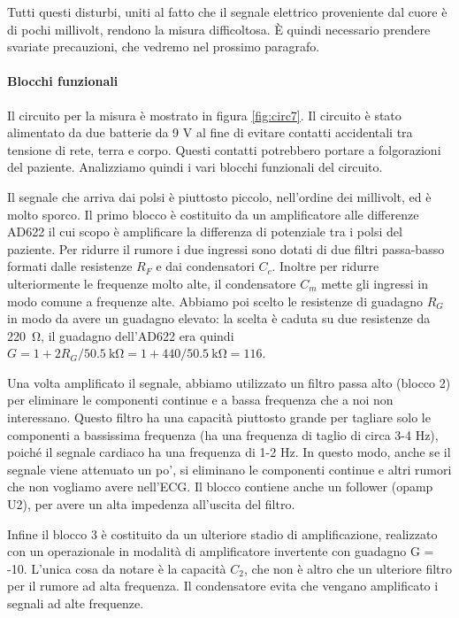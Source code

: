 Tutti questi disturbi, uniti al fatto che il segnale elettrico proveniente dal cuore è di pochi
millivolt, rendono la misura difficoltosa. È quindi necessario prendere svariate precauzioni, che vedremo nel
prossimo paragrafo.

\paragraph{Blocchi funzionali}

Il circuito per la misura è mostrato in figura \ref{fig:circ7}. Il circuito è stato alimentato da due batterie da
9 V al fine di evitare contatti accidentali tra tensione di rete, terra e corpo. Questi contatti potrebbero portare
a folgorazioni del paziente. Analizziamo quindi i vari blocchi funzionali del circuito.

Il segnale che arriva dai polsi è piuttosto piccolo, nell'ordine dei millivolt, ed è molto sporco.
Il primo blocco è costituito da un amplificatore alle differenze AD622 il cui scopo è amplificare
la differenza di potenziale tra i polsi del paziente. Per ridurre il rumore i due ingressi sono dotati
di due filtri passa-basso formati dalle resistenze $R_F$ e dai condensatori $C_c$. Inoltre per ridurre
ulteriormente le frequenze molto alte, il condensatore $C_m$ mette gli ingressi in modo comune
a frequenze alte. Abbiamo poi scelto le resistenze di guadagno $R_G$ in modo da avere un guadagno elevato:
la scelta è caduta su due resistenze da \SI{220}{\ohm}, il guadagno dell'AD622 era quindi
$G = 1 + 2R_G/\SI{50.5}{\kilo\ohm} = 1 + 440/\SI{50.5}{\kilo\ohm} = 116$. 

Una volta amplificato il segnale, abbiamo utilizzato un filtro passa alto (blocco 2)
per eliminare le componenti continue e a bassa frequenza che a noi non interessano.
Questo filtro ha una capacità piuttosto grande per tagliare solo le componenti a bassissima frequenza
(ha una frequenza di taglio di circa 3-4 Hz), poiché il segnale cardiaco ha una frequenza di 1-2 Hz.
In questo modo, anche se il segnale viene attenuato un po', si eliminano le componenti continue e altri rumori
che non vogliamo avere nell'ECG. Il blocco contiene anche un follower (opamp U2),
per avere un alta impedenza all'uscita del filtro.

Infine il blocco 3 è costituito da un ulteriore stadio di amplificazione, realizzato con un operazionale in modalità
di amplificatore invertente con guadagno G = -10. L'unica cosa da notare è la capacità $C_2$, che non è altro che un ulteriore
filtro per il rumore ad alta frequenza. Il condensatore evita che vengano amplificato i segnali ad alte frequenze.

